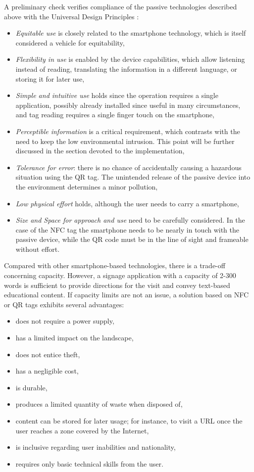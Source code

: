 \documentclass[sustainability,article,submit,pdftex,moreauthors]{Definitions/mdpi}
\begin{document}
A preliminary check verifies compliance of the passive technologies described above with the Universal Design Principles \cite{udi97a}:

\begin{itemize}
	\item {\em Equitable use} is closely related to the smartphone technology, which is itself considered a vehicle for equitability,
	\item {\em Flexibility in use} is enabled by the device capabilities, which allow listening instead of reading, translating the information in a different language, or storing it for later use,
	\item {\em Simple and intuitive use} holds since the operation requires a single application, possibly already installed since useful in many circumstances, and tag reading requires a single finger touch on the smartphone,
	\item{\em Perceptible information} is a critical requirement, which contrasts with the need to keep the low environmental intrusion. This point will be further discussed in the section devoted to the implementation,
	\item{\em Tolerance for error}: there is no chance of accidentally causing a hazardous situation using the QR tag. The unintended release of the passive device into the environment determines a minor pollution,
	\item{\em Low physical effort} holds, although the user needs to carry a smartphone,
	\item{\em Size and Space for approach and use} need to be carefully considered. In the case of the NFC tag the smartphone needs to be nearly in touch with the passive device, while the QR code must be in the line of sight and frameable without effort.
\end{itemize}

Compared with other smartphone-based technologies, there is a trade-off concerning capacity. However, a signage application with a capacity of 2-300 words is sufficient to provide directions for the visit and convey text-based educational content. If capacity limits are not an issue, a solution based on NFC or QR tags exhibits several advantages:

\begin{itemize} 
\item does not require a power supply,
\item has a limited impact on the landscape,
\item does not entice theft,
\item has a negligible cost,
\item is durable,
\item produces a limited quantity of waste when disposed of,
\item content can be stored for later usage; for instance, to visit a URL once the user reaches a zone covered by the Internet,
\item is inclusive regarding user inabilities and nationality,
\item requires only basic technical skills from the user.
\end{itemize}
\end{document}
